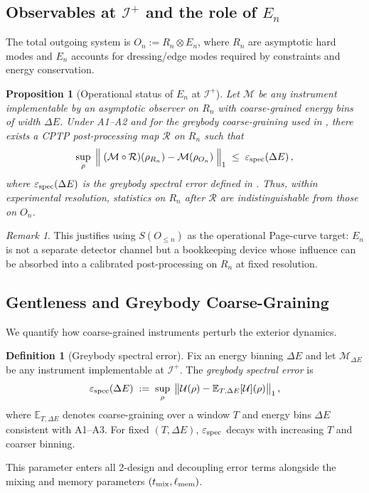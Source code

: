 \documentclass[a4paper,11pt]{article}
\theoremstyle{plain}
\newtheorem{proposition}{Proposition}
\theoremstyle{definition}
\newtheorem{definition}{Definition}
\theoremstyle{remark}
\newtheorem{remark}{Remark}
\begin{document}
\subsection{Observables at $\mathscr{I}^+$ and the role of $E_n$}
\label{sec:Iplus-En}
The total outgoing system is $O_n := R_n\otimes E_n$, where $R_n$ are asymptotic hard modes and $E_n$ accounts for dressing/edge modes required by constraints and energy conservation.
\begin{proposition}[Operational status of $E_n$ at $\mathscr{I}^+$]\label{prop:En-operational}
Let $\mathcal{M}$ be any instrument implementable by an asymptotic observer on $R_n$ with coarse-grained energy bins of width $\Delta E$. Under A1--A2 and for the greybody coarse-graining used in , there exists a CPTP post-processing map $\mathcal{R}$ on $R_n$ such that
\begin{equation*}
\sup_{\rho}\;\Big\|\; (\mathcal{M}\circ\mathcal{R})(\rho_{R_n}) - \mathcal{M}(\rho_{O_n}) \;\Big\|_1 \;\le\; \varepsilon_{\rm spec}(\Delta E)\,,
\end{equation*}
where $\varepsilon_{\rm spec}(\Delta E)$ is the greybody spectral error defined in . Thus, within experimental resolution, statistics on $R_n$ after $\mathcal{R}$ are indistinguishable from those on $O_n$.
\end{proposition}
\begin{remark}
This justifies using $S(O_{\le n})$ as the operational Page-curve target: $E_n$ is not a separate detector channel but a bookkeeping device whose influence can be absorbed into a calibrated post-processing on $R_n$ at fixed resolution.
\end{remark}

\subsection{Gentleness and Greybody Coarse-Graining} %
\label{sec:gentleness}
We quantify how coarse-grained instruments perturb the exterior dynamics.
\begin{definition}[Greybody spectral error]
Fix an energy binning $\Delta E$ and let $\mathcal{M}_{\Delta E}$ be any instrument implementable at $\mathscr{I}^+$. The \emph{greybody spectral error} is
\begin{equation*}
\varepsilon_{\rm spec}(\Delta E) \;:=\; \sup_{\rho}\; \big\| \mathcal{U}(\rho) - \mathbb{E}_{T,\Delta E}[\mathcal{U}](\rho) \big\|_1\,,
\end{equation*}
where $\mathbb{E}_{T,\Delta E}$ denotes coarse-graining over a window $T$ and energy bins $\Delta E$ consistent with A1--A3. For fixed $(T,\Delta E)$, $\varepsilon_{\rm spec}$ decays with increasing $T$ and coarser binning.
\end{definition}
This parameter enters all 2-design and decoupling error terms alongside the mixing and memory parameters $(t_{\rm mix},\ell_{\rm mem})$.
\end{document}
